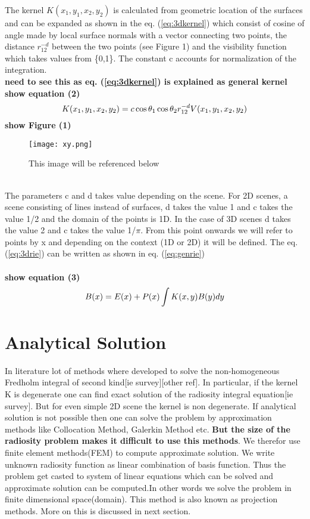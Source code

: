 The kernel $K(x_1,y_1,x_2,y_2)$ is calculated from geometric location of the surfaces and can be expanded as shown in the eq. (\ref{eq:3dkernel}) which consist of cosine of angle made by local surface normals with a vector connecting two points, the distance  $r_{12}^{-d}$ between the two points (see Figure 1) and the visibility function which takes values from \{0,1\}. The constant c accounts for normalization of the integration. \\
{\bf need to see this as eq. (\ref{eq:3dkernel}) is explained as general kernel}\\
{\bf show equation (2)}\\
\begin{equation} \label{eq:3dkernel}
K(x_1,y_1,x_2,y_2) = c \cos \theta_1 \cos \theta_2 r_{12}^{-d} V(x_1,y_1,x_2,y_2) \\ 
\end{equation}
{\bf show Figure (1)}\\
\begin{figure}[h]
\centering
\texttt{[image: xy.png]}
\caption{This image will be referenced below}
\label{fig:xytheta}
\end{figure}\\
The parameters c and d takes value depending on  the scene. For 2D scenes, a scene consisting of lines instead of surfaces, d takes the value 1 and c takes the value 1/2 and the domain of the points is 1D. In the case of 3D scenes d takes the value 2 and c takes the value 1/$\pi$. From this point onwards we will refer to points by x and depending on the context (1D or  2D) it will be defined. The eq. (\ref{eq:3drie}) can be written as shown in eq. (\ref{eq:genrie})\\\\
{\bf show equation (3)}
\begin{equation} \label{eq:genrie}
B(x)=E(x)+P(x)\int K(x,y)B(y)dy\\\\
\end{equation}
\section{Analytical Solution}
In literature lot of methods where developed to solve the non-homogeneous Fredholm integral of second kind[ie survey][other ref]. In particular, if the kernel K is degenerate one can find exact solution of the radiosity integral equation[ie survey]. But for even simple 2D scene the kernel is non degenerate. If analytical solution is not possible then one can solve the problem by approximation methods like Collocation Method, Galerkin Method etc. {\bf But the size of the radiosity problem makes it difficult to use this methods}. We therefor use finite element methods(FEM) to compute approximate solution. We write unknown radiosity function as linear combination of basis function. Thus the problem get casted to system of linear equations which can be solved and approximate solution can be computed.In other words we solve the problem in finite dimensional space(domain). This method is also known as projection methods. More on this is discussed in next section.

